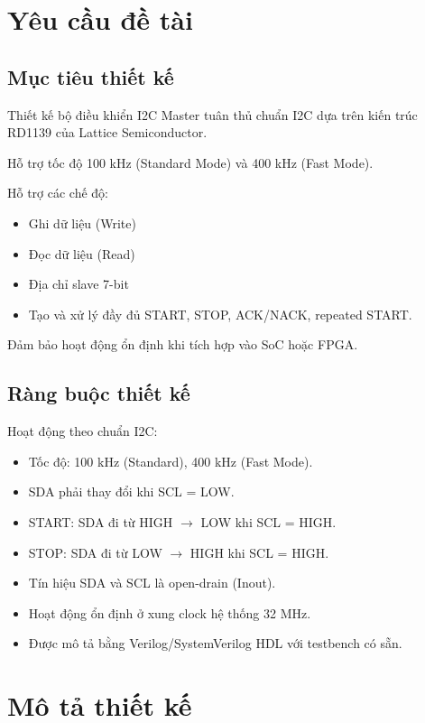 \section{Yêu cầu đề tài}

\subsection{Mục tiêu thiết kế}
Thiết kế bộ điều khiển I2C Master tuân thủ chuẩn I2C dựa trên kiến trúc RD1139 của Lattice Semiconductor.

Hỗ trợ tốc độ 100 kHz (Standard Mode) và 400 kHz (Fast Mode).

Hỗ trợ các chế độ:
\begin{itemize}[leftmargin=1.2cm]
    \item Ghi dữ liệu (Write)
    \item Đọc dữ liệu (Read)
    \item Địa chỉ slave 7-bit
    \item Tạo và xử lý đầy đủ START, STOP, ACK/NACK, repeated START.
\end{itemize}

Đảm bảo hoạt động ổn định khi tích hợp vào SoC hoặc FPGA.

\subsection{Ràng buộc thiết kế}
Hoạt động theo chuẩn I2C:
\begin{itemize}[leftmargin=1.2cm]
    \item Tốc độ: 100 kHz (Standard), 400 kHz (Fast Mode).
    \item SDA phải thay đổi khi SCL = LOW.
    \item START: SDA đi từ HIGH $\rightarrow$ LOW khi SCL = HIGH.
    \item STOP: SDA đi từ LOW $\rightarrow$ HIGH khi SCL = HIGH.
    \item Tín hiệu SDA và SCL là open-drain (Inout).
    \item Hoạt động ổn định ở xung clock hệ thống 32 MHz.
    \item Được mô tả bằng Verilog/SystemVerilog HDL với testbench có sẵn.
\end{itemize}

\section{Mô tả thiết kế}

